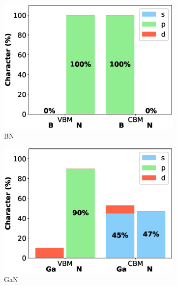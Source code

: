 \begin{figure}[!ht]
\begin{subfigure}{0.3\textwidth}
  \includegraphics[width=\linewidth]{images/bn_2d_composition.eps}
  \caption{BN}
\end{subfigure}\hfil %
\begin{subfigure}{0.3\textwidth}
  \includegraphics[width=\linewidth]{images/gan_2d_composition.eps}
  \caption{GaN}
\end{subfigure}\hfil %
\begin{subfigure}{0.3\textwidth}

\end{subfigure}
\end{figure}
